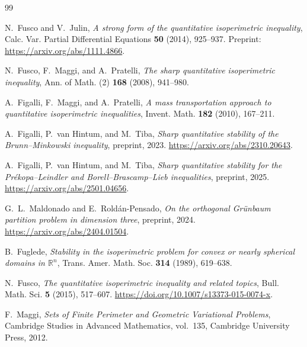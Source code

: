 \documentclass[11pt]{amsart}
\theoremstyle{definition}
\newcommand{\R}{\mathbb R}
\begin{document}
\begin{thebibliography}{99}

N.~Fusco and V.~Julin,
\emph{A strong form of the quantitative isoperimetric inequality},
Calc. Var. Partial Differential Equations \textbf{50} (2014), 925--937.
Preprint: \url{https://arxiv.org/abs/1111.4866}.

N.~Fusco, F.~Maggi, and A.~Pratelli,
\emph{The sharp quantitative isoperimetric inequality},
Ann. of Math. (2) \textbf{168} (2008), 941--980.

A.~Figalli, F.~Maggi, and A.~Pratelli,
\emph{A mass transportation approach to quantitative isoperimetric
inequalities},
Invent. Math. \textbf{182} (2010), 167--211.

A.~Figalli, P.~van Hintum, and M.~Tiba,
\emph{Sharp quantitative stability of the Brunn--Minkowski inequality},
preprint, 2023.
\url{https://arxiv.org/abs/2310.20643}.

A.~Figalli, P.~van Hintum, and M.~Tiba,
\emph{Sharp quantitative stability for the Pr\'ekopa--Leindler and
Borell--Brascamp--Lieb inequalities},
preprint, 2025.
\url{https://arxiv.org/abs/2501.04656}.

G.~L.~Maldonado and E.~Rold\'an-Pensado,
\emph{On the orthogonal Gr\"unbaum partition problem in dimension three},
preprint, 2024.
\url{https://arxiv.org/abs/2404.01504}.

B.~Fuglede,
\emph{Stability in the isoperimetric problem for convex or nearly spherical
domains in \(\R^n\)},
Trans. Amer. Math. Soc. \textbf{314} (1989), 619--638.

N.~Fusco,
\emph{The quantitative isoperimetric inequality and related topics},
Bull. Math. Sci. \textbf{5} (2015), 517--607.
\url{https://doi.org/10.1007/s13373-015-0074-x}.

F.~Maggi,
\emph{Sets of Finite Perimeter and Geometric Variational Problems},
Cambridge Studies in Advanced Mathematics, vol.~135,
Cambridge University Press, 2012.

\end{thebibliography}
\end{document}
